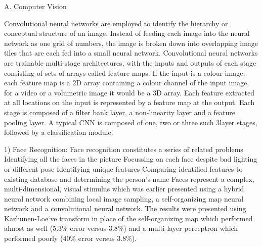 \documentclass[12pt]{article}
\begin{document}
A. Computer Vision

Convolutional neural networks are employed to identify
the hierarchy or conceptual structure of an image. Instead of
feeding each image into the neural network as one grid of
numbers, the image is broken down into overlapping image
tiles that are each fed into a small neural network.
Convolutional neural networks are trainable multi-stage
architectures,  with the inputs and outputs of each
stage consisting of sets of arrays called feature maps. If the
input is a colour image, each feature map is a 2D array
containing a colour channel of the input image, for a video
or a volumetric image it would be a 3D array. Each feature
extracted at all locations on the input is represented by a
feature map at the output. Each stage is composed of a filter
bank layer, a non-linearity layer and a feature pooling layer.
A typical CNN is composed of one, two or three such 3layer stages, followed by a classification module.

1) Face Recognition: Face recognition constitutes a
series of related problems
Identifying all the faces in the picture
Focussing on each face despite bad lighting or
different pose
Identifying unique features
Comparing identified features to existing database
and determining the person's name
Faces represent a complex, multi-dimensional, visual
stimulus which was earlier presented using a hybrid neural
network combining local image sampling, a self-organizing
map neural network and a convolutional neural network.
The results were presented using Karhunen-Loe`ve
transform in place of the self-organizing map which
performed almost as well (5.3\% error versus 3.8\%) and a
multi-layer perceptron which performed poorly (40\% error
versus 3.8\%). 
\end{document}

